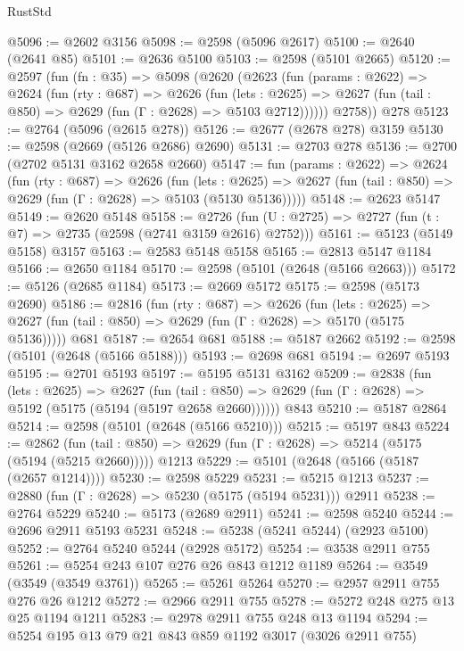 \begin{lexlean}{RustStd}
\begin{coremodule}
@5096 := @2602 @3156
@5098 := @2598 (@5096 @2617)
@5100 := @2640 (@2641 @85)
@5101 := @2636 @5100
@5103 := @2598 (@5101 @2665)
@5120 := @2597
    (fun (fn : @35) =>
    @5098
      (@2620
        (@2623
          (fun (params : @2622) =>
          @2624
            (fun (rty : @687) =>
            @2626
              (fun (lets : @2625) =>
              @2627 (fun (tail : @850) => @2629 (fun (Γ : @2628) => @5103 @2712))))))
        @2758))
    @278
@5123 := @2764 (@5096 (@2615 @278))
@5126 := @2677 (@2678 @278) @3159
@5130 := @2598 (@2669 (@5126 @2686) @2690)
@5131 := @2703 @278
@5136 := @2700 (@2702 @5131 @3162 @2658 @2660)
@5147 := fun (params : @2622) =>
  @2624
    (fun (rty : @687) =>
    @2626
      (fun (lets : @2625) =>
      @2627 (fun (tail : @850) => @2629 (fun (Γ : @2628) => @5103 (@5130 @5136)))))
@5148 := @2623 @5147
@5149 := @2620 @5148
@5158 := @2726 (fun (U : @2725) => @2727 (fun (t : @7) => @2735 (@2598 (@2741 @3159 @2616) @2752)))
@5161 := @5123 (@5149 @5158) @3157
@5163 := @2583 @5148 @5158
@5165 := @2813 @5147 @1184
@5166 := @2650 @1184
@5170 := @2598 (@5101 (@2648 (@5166 @2663)))
@5172 := @5126 (@2685 @1184)
@5173 := @2669 @5172
@5175 := @2598 (@5173 @2690)
@5186 := @2816
    (fun (rty : @687) =>
    @2626
      (fun (lets : @2625) =>
      @2627 (fun (tail : @850) => @2629 (fun (Γ : @2628) => @5170 (@5175 @5136)))))
    @681
@5187 := @2654 @681
@5188 := @5187 @2662
@5192 := @2598 (@5101 (@2648 (@5166 @5188)))
@5193 := @2698 @681
@5194 := @2697 @5193
@5195 := @2701 @5193
@5197 := @5195 @5131 @3162
@5209 := @2838
    (fun (lets : @2625) =>
    @2627
      (fun (tail : @850) => @2629 (fun (Γ : @2628) => @5192 (@5175 (@5194 (@5197 @2658 @2660))))))
    @843
@5210 := @5187 @2864
@5214 := @2598 (@5101 (@2648 (@5166 @5210)))
@5215 := @5197 @843
@5224 := @2862
    (fun (tail : @850) => @2629 (fun (Γ : @2628) => @5214 (@5175 (@5194 (@5215 @2660)))))
    @1213
@5229 := @5101 (@2648 (@5166 (@5187 (@2657 @1214))))
@5230 := @2598 @5229
@5231 := @5215 @1213
@5237 := @2880 (fun (Γ : @2628) => @5230 (@5175 (@5194 @5231))) @2911
@5238 := @2764 @5229
@5240 := @5173 (@2689 @2911)
@5241 := @2598 @5240
@5244 := @2696 @2911 @5193 @5231
@5248 := @5238 (@5241 @5244) (@2923 @5100)
@5252 := @2764 @5240 @5244 (@2928 @5172)
@5254 := @3538 @2911 @755
@5261 := @5254 @243 @107 @276 @26 @843 @1212 @1189
@5264 := @3549 (@3549 (@3549 @3761))
@5265 := @5261 @5264
@5270 := @2957 @2911 @755 @276 @26 @1212
@5272 := @2966 @2911 @755
@5278 := @5272 @248 @275 @13 @25 @1194 @1211
@5283 := @2978 @2911 @755 @248 @13 @1194
@5294 := @5254 @195 @13 @79 @21 @843 @859 @1192 @3017 (@3026 @2911 @755)

\end{coremodule}
\end{lexlean}
